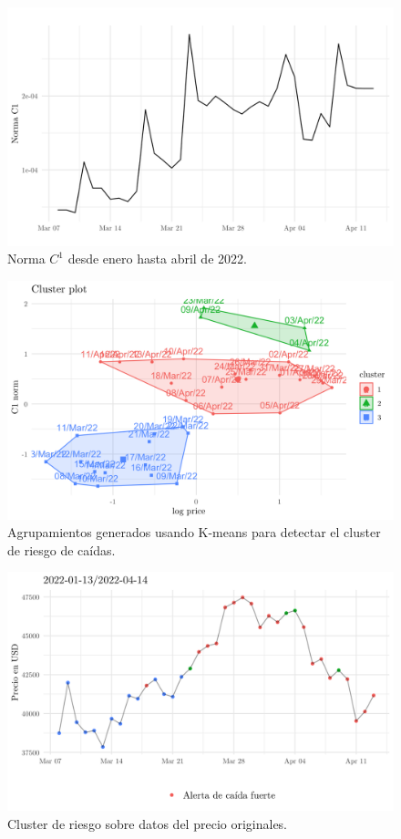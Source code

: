 \begin{figure}
	\centering
	\includegraphics[scale=0.3]{Chapter5/norma_c1_3meses.png}
	\caption{Norma $C^1$ desde enero hasta abril de 2022.}
	\label{fig24}
\end{figure}

\begin{figure}[h!]
	\centering
	\includegraphics[scale=0.3]{Chapter5/cluster_riesgo.png}
	\caption{Agrupamientos generados usando K-means para detectar el cluster de riesgo de caídas.}
	\label{fig25}
\end{figure}

\begin{figure}[h!]
	\centering
	\includegraphics[scale=0.3]{Chapter5/pred_TDA.png}
	\caption{Cluster de riesgo sobre datos del precio originales.}
	\label{fig26}
\end{figure}



